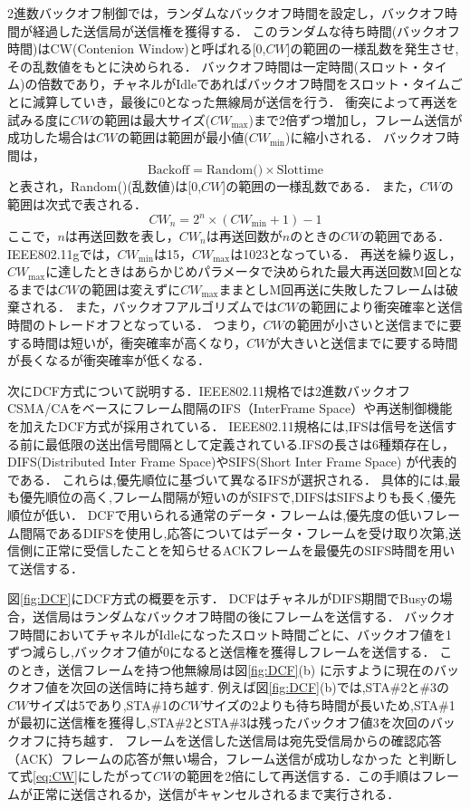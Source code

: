 \documentclass[a4paper,10.5pt]{ltjsarticle}
\begin{document}
2進数バックオフ制御では，ランダムなバックオフ時間を設定し，バックオフ時間が経過した送信局が送信権を獲得する．
このランダムな待ち時間(バックオフ時間)はCW(Contenion Window)と呼ばれる[0,$CW$]の範囲の一様乱数を発生させ,その乱数値をもとに決められる．
バックオフ時間は一定時間(スロット・タイム)の倍数であり，チャネルがIdleであればバックオフ時間をスロット・タイムごとに減算していき，最後に0となった無線局が送信を行う．
衝突によって再送を試みる度に$CW$の範囲は最大サイズ($CW_{\text{max}}$)まで2倍ずつ増加し，フレーム送信が成功した場合は$CW$の範囲は範囲が最小値($CW_{\text{min}}$)に縮小される．
バックオフ時間は，
\begin{equation}
 \text{Backoff}  = \text{Random()} \times \text{Slottime}
\end{equation}
と表され，Random()(乱数値)は[0,$CW$]の範囲の一様乱数である．
また，$CW$の範囲は次式で表される．
\begin{equation}
  CW_n = 2^{n} \times (CW_{\text{min}}+1)-1
  \label{eq:CW}
\end{equation}
ここで，$n$は再送回数を表し，$CW_n$は再送回数が$n$のときの$CW$の範囲である．
IEEE802.11gでは，$CW_{\text{min}}$は15，$CW_{\text{max}}$は1023となっている．
再送を繰り返し，$CW_{\text{max}}$に達したときはあらかじめパラメータで決められた最大再送回数M回となるまでは$CW$の範囲は変えずに$CW_{\text{max}}$ままとしM回再送に失敗したフレームは破棄される．
また，バックオフアルゴリズムでは$CW$の範囲により衝突確率と送信時間のトレードオフとなっている．
つまり，$CW$の範囲が小さいと送信までに要する時間は短いが，衝突確率が高くなり，$CW$が大きいと送信までに要する時間が長くなるが衝突確率が低くなる．\par
次にDCF方式について説明する．IEEE802.11規格では2進数バックオフCSMA/CAをベースにフレーム間隔のIFS（InterFrame Space）や再送制御機能を加えたDCF方式が採用されている．
IEEE802.11規格には,IFSは信号を送信する前に最低限の送出信号間隔として定義されている.IFSの長さは6種類存在し，DIFS(Distributed Inter Frame Space)やSIFS(Short Inter Frame Space) が代表的である．
これらは,優先順位に基づいて異なるIFSが選択される．
具体的には,最も優先順位の高く,フレーム間隔が短いのがSIFSで,DIFSはSIFSよりも長く,優先順位が低い．
DCFで用いられる通常のデータ・フレームは,優先度の低いフレーム間隔であるDIFSを使用し,応答についてはデータ・フレームを受け取り次第,送信側に正常に受信したことを知らせるACKフレームを最優先のSIFS時間を用いて送信する．\par
図\ref{fig:DCF}にDCF方式の概要を示す．
DCFはチャネルがDIFS期間でBusyの場合，送信局はランダムなバックオフ時間の後にフレームを送信する．
バックオフ時間においてチャネルがIdleになったスロット時間ごとに、バックオフ値を1ずつ減らし,バックオフ値が0になると送信権を獲得しフレームを送信する．
このとき，送信フレームを持つ他無線局は図\ref{fig:DCF}(b) に示すように現在のバックオフ値を次回の送信時に持ち越す.
例えば図\ref{fig:DCF}(b)では,STA\#2と\#3の$CW$サイズは5であり,STA\#1の$CW$サイズの2よりも待ち時間が長いため,STA\#1が最初に送信権を獲得し,STA\#2とSTA\#3は残ったバックオフ値3を次回のバックオフに持ち越す．
フレームを送信した送信局は宛先受信局からの確認応答（ACK）フレームの応答が無い場合，フレーム送信が成功しなかった
と判断して式\ref{eq:CW}にしたがって$CW$の範囲を2倍にして再送信する．この手順はフレームが正常に送信されるか，送信がキャンセルされるまで実行される．
\end{document}
